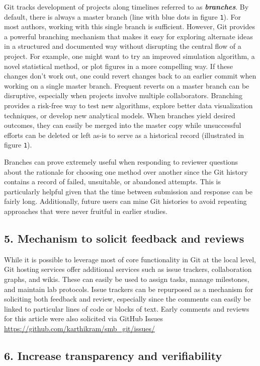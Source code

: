 \documentclass[]{article}
\begin{document}
Git tracks development of projects along timelines referred to as
\textbf{\emph{branches}}. By default, there is always a master branch
(line with blue dots in figure \texttt{1}). For most authors, working
with this single branch is sufficient. However, Git provides a powerful
branching mechanism that makes it easy for exploring alternate ideas in
a structured and documented way without disrupting the central flow of a
project. For example, one might want to try an improved simulation
algorithm, a novel statistical method, or plot figures in a more
compelling way. If these changes don't work out, one could revert
changes back to an earlier commit when working on a single master
branch. Frequent reverts on a master branch can be disruptive,
especially when projects involve multiple collaborators. Branching
provides a risk-free way to test new algorithms, explore better data
visualization techniques, or develop new analytical models. When
branches yield desired outcomes, they can easily be merged into the
master copy while unsuccessful efforts can be deleted or left as-is to
serve as a historical record (illustrated in figure \texttt{1}).

Branches can prove extremely useful when responding to reviewer
questions about the rationale for choosing one method over another since
the Git history contains a record of failed, unsuitable, or abandoned
attempts. This is particularly helpful given that the time between
submission and response can be fairly long. Additionally, future users
can mine Git histories to avoid repeating approaches that were never
fruitful in earlier studies.

\subsection{5. Mechanism to solicit feedback and reviews}

While it is possible to leverage most of core functionality in Git at
the local level, Git hosting services offer additional services such as
issue trackers, collaboration graphs, and wikis. These can easily be
used to assign tasks, manage milestones, and maintain lab protocols.
Issue trackers can be repurposed as a mechanism for soliciting both
feedback and review, especially since the comments can easily be linked
to particular lines of code or blocks of text. Early comments and
reviews for this article were also solicited via GitHub Issues
\url{https://github.com/karthikram/smb_git/issues/}

\subsection{6. Increase transparency and verifiability}
\end{document}
